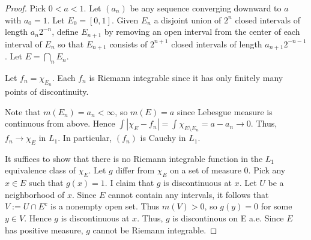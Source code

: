 \documentclass{article}
\begin{document}
\begin{proof}
Pick $0 < a < 1$. Let $(a_n)$ be any sequence converging downward to $a$ with $a_0 = 1$.  Let $E_0 = [0,1]$. Given $E_n$ a disjoint union of $2^n$ closed intervals of length $a_n 2^{-n}$, define $E_{n+1}$ by removing an open interval from the center of each interval of $E_n$ so that $E_{n+1}$ consists of $2^{n+1}$ closed intervals of length $a_{n+1} 2^{-n-1}$. Let $E = \bigcap_n E_n$.  

Let $f_n = \chi_{E_n}$.  Each $f_n$ is Riemann integrable since it has only finitely many points of discontinuity.  

Note that $m(E_n) = a_n < \infty$, so $m(E) = a$ since Lebesgue measure is continuous from above.  Hence $\int |\chi_E - f_n| = \int \chi_{E \setminus E_n} = a - a_n \to 0$. Thus, $f_n \to \chi_E$ in $L_1$.  In particular, $(f_n)$ is Cauchy in $L_1$.

It suffices to show that there is no Riemann integrable function in the $L_1$ equivalence class of $\chi_E$. Let $g$ differ from $\chi_E$ on a set of measure 0.  Pick any $x \in E$ such that $g(x) = 1$.  I claim that $g$ is discontinuous at $x$.  Let $U$ be a neighborhood of $x$.  Since $E$ cannot contain any intervals, it follows that $V := U \cap E^c$ is a nonempty open set.  Thus $m(V) > 0$, so $g(y) = 0$ for some $y \in V$.  Hence $g$ is discontinuous at $x$.  Thus, $g$ is discontinous on E a.e.  Since $E$ has positive measure, $g$ cannot be Riemann integrable.
\end{proof}
\end{document}
